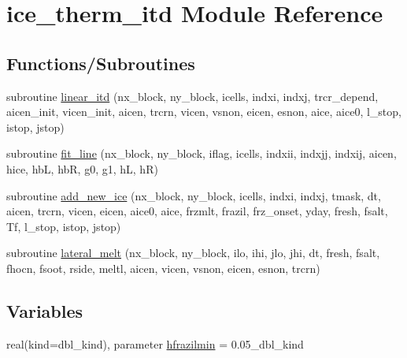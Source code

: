 \hypertarget{namespaceice__therm__itd}{
\section{ice\_\-therm\_\-itd Module Reference}
\label{namespaceice__therm__itd}
}
\subsection*{Functions/Subroutines}
\begin{DoxyCompactItemize}
\item 
subroutine \hyperlink{namespaceice__therm__itd_acd44275babbe78e10bc9ddcbd1c631cd}{linear\_\-itd} (nx\_\-block, ny\_\-block, icells, indxi, indxj, trcr\_\-depend, aicen\_\-init, vicen\_\-init, aicen, trcrn, vicen, vsnon, eicen, esnon, aice, aice0, l\_\-stop, istop, jstop)
\item 
subroutine \hyperlink{namespaceice__therm__itd_a6eda9b04392b3bc42d5b8cb373e8fc7d}{fit\_\-line} (nx\_\-block, ny\_\-block, iflag, icells, indxii, indxjj, indxij, aicen, hice, hbL, hbR, g0, g1, hL, hR)
\item 
subroutine \hyperlink{namespaceice__therm__itd_a6c41e380c1a3c0ee4f833a4f31f80de2}{add\_\-new\_\-ice} (nx\_\-block, ny\_\-block, icells, indxi, indxj, tmask, dt, aicen, trcrn, vicen, eicen, aice0, aice, frzmlt, frazil, frz\_\-onset, yday, fresh, fsalt, Tf, l\_\-stop, istop, jstop)
\item 
subroutine \hyperlink{namespaceice__therm__itd_a31484de362b540a7b089bea7e7cc8e81}{lateral\_\-melt} (nx\_\-block, ny\_\-block, ilo, ihi, jlo, jhi, dt, fresh, fsalt, fhocn, fsoot, rside, meltl, aicen, vicen, vsnon, eicen, esnon, trcrn)
\end{DoxyCompactItemize}
\subsection*{Variables}
\begin{DoxyCompactItemize}
\item 
real(kind=dbl\_\-kind), parameter \hyperlink{namespaceice__therm__itd_addb09aa25c77eb5ffb880aab7ddff915}{hfrazilmin} = 0.05\_\-dbl\_\-kind
\end{DoxyCompactItemize}



